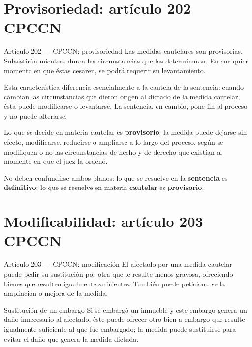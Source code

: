 \documentclass[12pt,oneside]{book}
\begin{document}
\section{Provisoriedad: artículo 202 CPCCN}

\begin{normativa}{Artículo 202 --- CPCCN: provisoriedad}
Las medidas cautelares son provisorias. Subsistirán mientras duren las circunstancias que las determinaron. En cualquier momento en que éstas cesaren, se podrá requerir su levantamiento.
\end{normativa}

Esta característica diferencia esencialmente a la cautela de la sentencia: cuando cambian las circunstancias que dieron origen al dictado de la medida cautelar, ésta puede modificarse o levantarse. La sentencia, en cambio, pone fin al proceso y no puede alterarse.

Lo que se decide en materia cautelar es \textbf{provisorio}: la medida puede dejarse sin efecto, modificarse, reducirse o ampliarse a lo largo del proceso, según se modifiquen o no las circunstancias de hecho y de derecho que existían al momento en que el juez la ordenó.

\begin{important}
No deben confundirse ambos planos: lo que se resuelve en la \textbf{sentencia} es \textbf{definitivo}; lo que se resuelve en materia \textbf{cautelar} es \textbf{provisorio}.
\end{important}

\section{Modificabilidad: artículo 203 CPCCN}

\begin{normativa}{Artículo 203 --- CPCCN: modificación}
El afectado por una medida cautelar puede pedir su sustitución por otra que le resulte menos gravosa, ofreciendo bienes que resulten igualmente suficientes. También puede peticionarse la ampliación o mejora de la medida.
\end{normativa}

\begin{example}{Sustitución de un embargo}
Si se embargó un inmueble y este embargo genera un daño innecesario al afectado, éste puede ofrecer otro bien a embargo que resulte igualmente suficiente al que fue embargado; la medida puede sustituirse para evitar el daño que genera la medida dictada.
\end{example}
\end{document}
